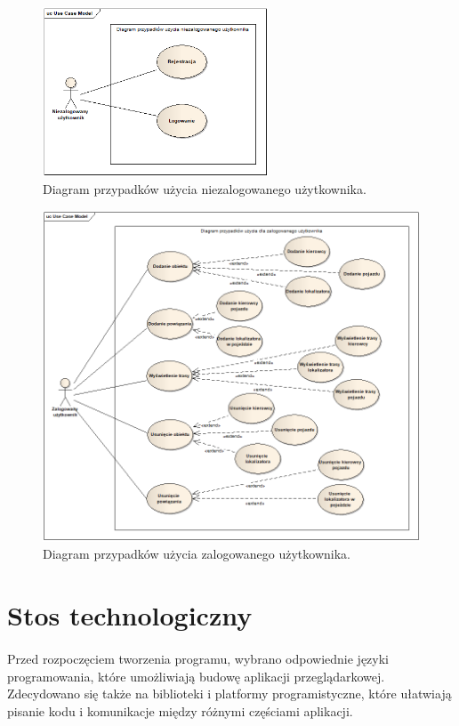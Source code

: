 \begin{figure}
\centering
\includegraphics[width=0.6\textwidth]{./graf/Przypadki_uzycia_niezalogowany.png}
\caption{Diagram przypadków użycia niezalogowanego użytkownika.}
\label{fig:3.1}
\end{figure}

\begin{figure}
\centering
\includegraphics[width=1\textwidth]{./graf/Przypadki_uzycia_zalogowany.png}
\caption{Diagram przypadków użycia zalogowanego użytkownika.}
\label{fig:3.2}
\end{figure}

\section{Stos technologiczny}
\paragraph{}
Przed rozpoczęciem tworzenia programu, wybrano odpowiednie języki programowania, które umożliwiają budowę aplikacji przeglądarkowej. Zdecydowano się także na biblioteki i platformy programistyczne, które ułatwiają pisanie kodu i komunikacje między różnymi częściami aplikacji.

